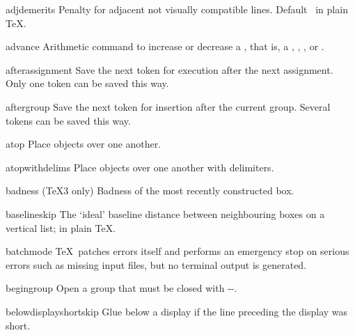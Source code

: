\item adjdemerits
      Penalty for adjacent not visually compatible lines. 
      Default~ in plain \TeX.

\item advance
      Arithmetic command to increase or decrease a 
      , that is,
 \alt
      a , , , 
      or .

\item afterassignment
      Save the next token for execution after the next assignment.
      Only one token can be saved this way.

\item aftergroup
      Save the next token for insertion after the current group.
      Several tokens can be saved this way.

\item atop
      Place objects over one another.

\item atopwithdelims
      Place objects over one another with delimiters.

\item badness
      (\TeX3 only) 
      Badness of the most recently constructed box.

\item baselineskip
      The `ideal' baseline distance between neighbouring 
      boxes on a vertical list;  \n{12pt} in plain \TeX.

\item batchmode
      \TeX\ patches errors itself 
 \alt
      and performs an emergency stop on serious errors 
      such as missing input files,
      but no terminal output is generated.

\item begingroup
      Open a group that must be closed with \ver-\endgroup-.

\item belowdisplayshortskip
      Glue below a display if the line preceding the display was short.

